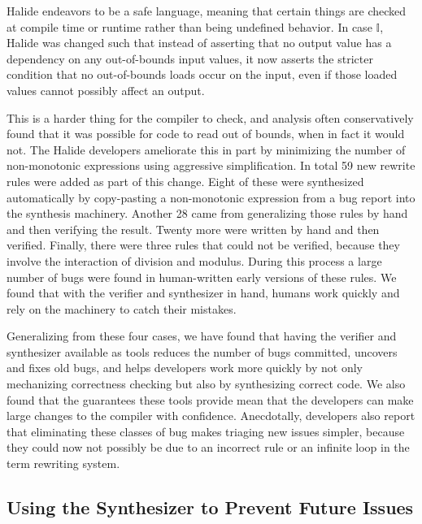 \documentclass[acmsmall]{acmart}\settopmatter{}
\begin{document}
Halide endeavors to be a safe language, meaning that certain things are checked at compile time or runtime rather than being undefined behavior. In case $\mathbb{I}$, Halide was changed such that instead of asserting that no output value has a dependency on any out-of-bounds input values, it now asserts the stricter condition that no out-of-bounds loads occur on the input, even if those loaded values cannot possibly affect an output.

This is a harder thing for the compiler to check, and analysis often conservatively found that it was possible for code to read out of bounds, when in fact it would not. The Halide developers ameliorate this in part by minimizing the number of non-monotonic expressions using aggressive simplification. In total 59 new rewrite rules were added as part of this change. Eight of these were synthesized automatically by copy-pasting a non-monotonic expression from a bug report into the synthesis machinery. Another 28 came from generalizing those rules by hand and then verifying the result. Twenty more were written by hand and then verified. Finally, there were three rules that could not be verified, because they involve the interaction of division and modulus. During this process a large number of bugs were found in human-written early versions of these rules. We found that with the verifier and synthesizer in hand, humans work quickly and rely on the machinery to catch their mistakes.

Generalizing from these four cases, we have found that having the verifier and synthesizer available as tools reduces the number of bugs committed, uncovers and fixes old bugs, and helps developers work more quickly by not only mechanizing correctness checking but also by synthesizing correct code. We also found that the guarantees these tools provide mean that the developers can make large changes to the compiler with confidence. Anecdotally, developers also report that eliminating these classes of bug makes triaging new issues simpler, because they could now not possibly be due to an incorrect rule or an infinite loop in the term rewriting system.

\subsection{Using the Synthesizer to Prevent Future Issues}
\label{ssec:compilationspeed}
\end{document}
